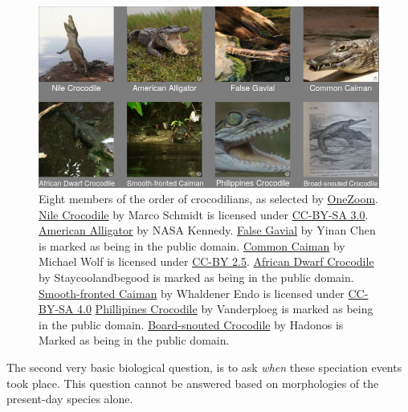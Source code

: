 \begin{figure}[H]
  \includegraphics[width=1.0\textwidth]{crocodilians.png}
  \caption{
    Eight members of the order of crocodilians,
    as selected by \href{https://www.onezoom.org/life.html/@Crocodylia=195672\#x1602,y148,w4.1516}{OneZoom}.
    \href{http://media.eol.org/content/2018/04/11/13/61270_orig.jpg}{Nile Crocodile}
    by Marco Schmidt
    is licensed under \href{http://creativecommons.org/licenses/by-sa/3.0}{CC-BY-SA 3.0}.
    \href{https://www.flickr.com/photos/nasakennedy/14159295507}{American Alligator}
    by NASA Kennedy.
    \href{http://media.eol.org/content/2014/10/06/10/58393_orig.jpg}{False Gavial}
    by Yinan Chen
    is marked as being in the public domain.
    \href{http://media.eol.org/content/2012/06/13/05/87714_orig.jpg}{Common Caiman}
    by Michael Wolf
    is licensed under \href{http://creativecommons.org/licenses/by/2.5}{CC-BY 2.5}.
    \href{http://media.eol.org/content/2013/06/11/03/12146_orig.jpg}{African Dwarf Crocodile}
    by Staycoolandbegood
    is marked as being in the public domain.
    \href{http://media.eol.org/content/2013/11/25/21/58484_orig.jpg}{Smooth-fronted Caiman}
    by Whaldener Endo
    is licensed under \href{http://creativecommons.org/licenses/by-sa/4.0}{CC-BY-SA 4.0}
    \href{http://media.eol.org/content/2013/06/11/03/06619_orig.jpg}{Phillipines Crocodile}
    by Vanderploeg
    is marked as being in the public domain.
    \href{http://media.eol.org/content/2014/10/06/16/93746_orig.jpg}{Board-snouted Crocodile}
    by Hadonos
    is Marked as being in the public domain.
  }
  \label{fig:crocodialians}
\end{figure}

The second very basic biological question, is to 
ask \emph{when} these speciation events took place.
This question cannot be answered based on morphologies of the present-day
species alone.

